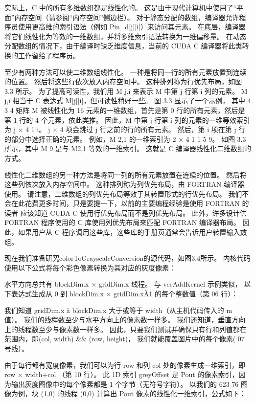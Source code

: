 实际上，C 中的所有多维数组都是线性化的。 这是由于现代计算机中使用了“平面”内存空间（请参阅“内存空间”侧边栏）。 
对于静态分配的数组，编译器允许程序员使用更高维的索引语法（例如 Pin\_d[j][i]）来访问其元素。 
在底层，编译器将它们线性化为等效的一维数组，并将多维索引语法转换为一维偏移量。 
在动态分配数组的情况下，由于编译时缺乏维度信息，当前的 CUDA C 编译器将此类转换的工作留给了程序员。

至少有两种方法可以使二维数组线性化。 一种是将同一行的所有元素放置到连续的位置。 然后将这些行依次放入内存空间中。 
这种排列称为行优先布局，如图 3.3 所示。 为了提高可读性，我们用 M j,i 来表示 M 中第 j 行第 i 列的元素。 
M j,i 相当于 C 表达式 M[j][i]，但可读性稍好一些。 图 3.3 显示了一个示例，
其中 4 3 4 矩阵 M 被线性化为 16 元素的一维数组，首先是第 0 行的所有元素，然后是第 1 行的 4 个元素，依此类推。 
因此，M 中第 j 行第 i 列的元素的一维等效索引为 j × 4 1 i。 j × 4 项会跳过 j 行之前的行的所有元素。 
然后，第 i 项在第 j 行的部分中选择正确的元素。 例如，M 2,1 的一维索引为 2 × 4 1 1 5 9。
如图 3.3 所示，其中 M 9 是与 M2,1 等效的一维索引。 这就是 C 编译器线性化二维数组的方式。

线性化二维数组的另一种方法是将同一列的所有元素放置在连续的位置。 然后将这些列依次放入内存空间中。 
这种排列称为列优先布局，由 FORTRAN 编译器使用。 请注意，二维数组的列优先布局等效于其转置形式的行优先布局。 
我们不会在此花费更多时间，只是要提一下，以前的主要编程经验是使用 FORTRAN 的读者
应该知道 CUDA C 使用行优先布局而不是列优先布局。 
此外，许多设计供 FORTRAN 程序使用的 C 库使用列优先布局来匹配 FORTRAN 编译器布局。 
因此，如果用户从 C 程序调用这些库，这些库的手册页通常会告诉用户转置输入数组。

现在我们准备研究colorToGrayscaleConversion的源代码，如图3.4所示。 
内核代码使用以下公式将每个彩色像素转换为其对应的灰度像素：

水平方向总共有 blockDim.x × gridDim.x 线程。 与 vecAddKernel 示例类似，
以下表达式生成从 0 到 blockDim.x × gridDim.xÀ1 的每个整数值（第 06 行）：

我们知道 gridDim.x à blockDim.x 大于或等于 width（从主机代码传入的 m 值）。 
我们的线程数至少与水平方向上的像素数一样多。 我们还知道，垂直方向上的线程数至少与像素数一样多。 
因此，只要我们测试并确保只有行和列值都在范围内，即(col, width) \&\& (row, height)，
我们就能覆盖图片中的每个像素( 07 号线）。

由于每行都有宽度像素，我们可以为行 row 和列 col 处的像素生成一维索引，即 row × width+col （第 10 行）。 
此 1D 索引 greyOffset 是 Pout 的像素索引，因为输出灰度图像中的每个像素都是 1 个字节（无符号字符）。 
以我们的 623 76 图像为例，块 (1,0) 的线程 (0,0) 计算出 Pout 像素的线性化一维索引，公式如下：


